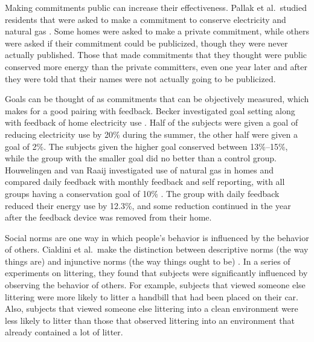 Making commitments public can increase their effectiveness. Pallak et al.\ studied residents that were asked to make a commitment to conserve electricity and natural gas \cite{Pallak80}. Some homes were asked to make a private commitment, while others were asked if their commitment could be publicized, though they were never actually published. Those that made commitments that they thought were public conserved more energy than the private committers, even one year later and after they were told that their names were not actually going to be publicized.

Goals can be thought of as commitments that can be objectively measured, which makes for a good pairing with feedback. Becker investigated goal setting along with feedback of home electricity use \cite{Becker78}. Half of the subjects were given a goal of reducing electricity use by 20\% during the summer, the other half were given a goal of 2\%. The subjects given the higher goal conserved between 13\%--15\%, while the group with the smaller goal did no better than a control group. Houwelingen and van Raaij investigated use of natural gas in homes and compared daily feedback with monthly feedback and self reporting, with all groups having a conservation goal of 10\% \cite{Houwelingen89}. The group with daily feedback reduced their energy use by 12.3\%, and some reduction continued in the year after the feedback device was removed from their home.

Social norms are one way in which people's behavior is influenced by the behavior of others. Cialdini et al.\ make the distinction between descriptive norms (the way things are) and injunctive norms (the way things ought to be) \cite{Cialdini90}. In a series of experiments on littering, they found that subjects were significantly influenced by observing the behavior of others. For example, subjects that viewed someone else littering were more likely to litter a handbill that had been placed on their car. Also, subjects that viewed someone else littering into a clean environment were less likely to litter than those that observed littering into an environment that already contained a lot of litter.

